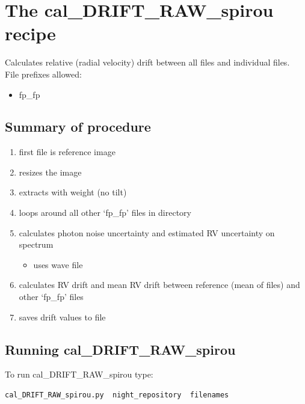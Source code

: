 \clearpage
\newpage
\section{The cal\_DRIFT\_RAW\_spirou recipe}
\label{section:cal_DRIFT_RAW_spirou}

Calculates relative (radial velocity) drift between all files and individual files. \\


\noindent File prefixes allowed:
\begin{itemize}
	\item fp\_fp
\end{itemize}

\subsection{Summary of procedure}
\begin{enumerate}
	\item first file is reference image
	\item resizes the image
	\item extracts with weight (no tilt)
	\item loops around all other `fp\_fp' files in directory
	\item calculates photon noise uncertainty and estimated RV uncertainty on spectrum
	\begin{itemize}
		\item uses wave file
	\end{itemize}
	\item calculates RV drift and mean RV drift between reference (mean of files) and other `fp\_fp' files
	\item saves drift values to file
\end{enumerate}

\subsection{Running cal\_DRIFT\_RAW\_spirou}

To run cal\_DRIFT\_RAW\_spirou type:
\begin{lstlisting}[language=bash, style=bashstyle]
cal_DRIFT_RAW_spirou.py  night_repository  filenames
\end{lstlisting}

